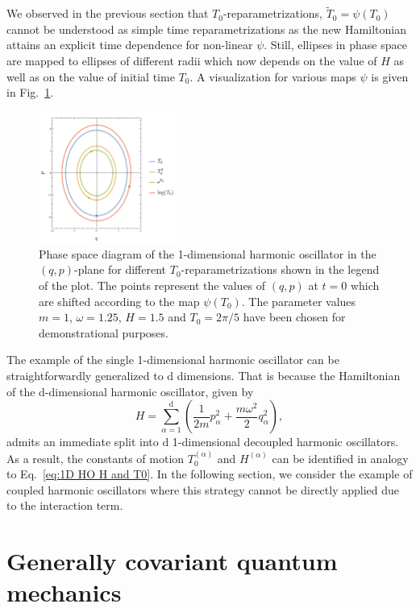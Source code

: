 \documentclass[onecolumn,notitlepage,superscriptaddress, nofootinbib,nobibnotes, aps,prd,10pt]{revtex4-1}%
\begin{document}
We observed in the previous section that $T_0$-reparametrizations, $\tilde{T}_0 = \psi(T_0)$ cannot be understood as simple time reparametrizations as the new Hamiltonian attains an explicit time dependence for non-linear $\psi$. Still, ellipses in phase space are mapped to ellipses of different radii which now depends on the value of $H$ as well as on the value of initial time $T_0$. A visualization for various maps $\psi$ is given in Fig.~\ref{fig:T0 reparam}.

\begin{figure}
    \centering
    \includegraphics[width=0.4\textwidth]{T0reparam.pdf}
    \caption{Phase space diagram of the 1-dimensional harmonic oscillator in the $(q,p)$-plane for different $T_0$-reparametrizations shown in the legend of the plot. The points represent the values of $(q,p)$ at $t = 0$ which are shifted according to the map $\psi(T_0)$. The parameter values $m=1$, $\omega = 1.25$, $H = 1.5$ and $T_0 = 2\pi/5$ have been chosen for demonstrational purposes.}
    \label{fig:T0 reparam}
\end{figure}

The example of the single 1-dimensional harmonic oscillator can be straightforwardly generalized to d dimensions. That is because the Hamiltonian of the d-dimensional harmonic oscillator, given by 
%
\begin{equation}
H = \sum_{\alpha = 1}^\mathrm{d}\left(\frac{1}{2m}p_\alpha^2+\frac{m\omega^2}{2}q_\alpha^2\right),
\end{equation}
%
admits an immediate split into d 1-dimensional decoupled harmonic oscillators. As a result, the constants of motion $T_0^{(\alpha)}$ and $H^{(\alpha)}$ can be identified in analogy to Eq.~\eqref{eq:1D HO H and T0}. In the following section, we consider the example of coupled harmonic oscillators where this strategy cannot be directly applied due to the interaction term.
 

\section{Generally covariant quantum mechanics}
\end{document}
